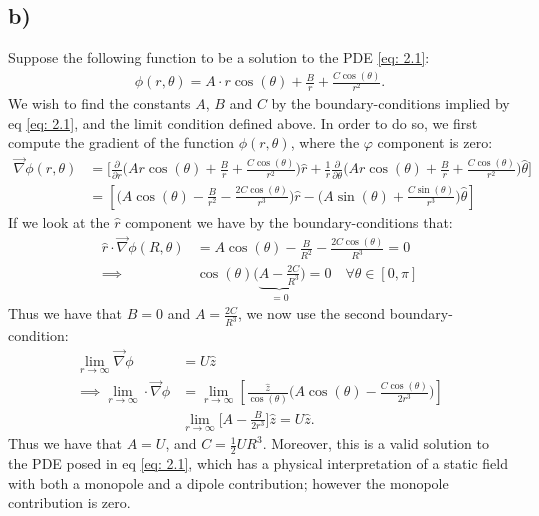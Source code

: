 \documentclass{article}
\begin{document}
\subsection*{b)}
Suppose the following function to be a solution to the PDE \eqref{eq: 2.1}:
\begin{align*}
    \phi(r, \theta) = A\cdot r\cos(\theta) + \frac{B}{r}+\frac{C\cos(\theta)}{r^2}.
\end{align*}
We wish to find the constants $A$, $B$ and $C$ by the boundary-conditions implied by eq \eqref{eq: 2.1}, and the limit condition defined above. In order to do so, we first compute the 
gradient of the function $\phi(r, \theta)$, where the $\varphi$ component is zero:
\begin{align*}
    \vec{\nabla}\phi(r, \theta)&=\Bigg[\frac{\partial}{\partial r}\Big(Ar\cos(\theta) + \frac{B}{r}+\frac{C\cos(\theta)}{r^2}\Big)\hat{r}+\frac{1}{r}\frac{\partial}{\partial \theta}\Big(Ar\cos(\theta) + \frac{B}{r}+\frac{C\cos(\theta)}{r^2}\Big)\hat{\theta}\Bigg]\\
    &=\left[\Big(A\cos(\theta) - \frac{B}{r^2} - \frac{2C\cos(\theta)}{r^3}\Big)\hat{r}-\Big(A\sin(\theta) +\frac{C\sin(\theta)}{r^3}\Big)\hat{\theta}\right]
\end{align*}
If we look at the $\hat{r}$ component we have by the boundary-conditions that:
\begin{align*}
    \hat{r}\cdot\vec{\nabla}\phi(R, \theta) &=A\cos(\theta) - \frac{B}{R^2} - \frac{2C\cos(\theta)}{R^3} = 0\\
    \implies &\cos(\theta)\Big(\underbrace{A-\frac{2C}{R^3}}_{=0}\Big)= 0\quad \forall\theta\in[0,\pi]
\end{align*}Thus we have that $B = 0$ and $A = \frac{2C}{R^3}$, we now use the second boundary-condition:
\begin{align*}
    \lim_{r\to\infty} \vec{\nabla}\phi &= U\hat{z}\\
    \implies \lim_{r\to\infty} \cdot\vec{\nabla}\phi&=\lim_{r\to\infty}\left[\frac{\hat{z}}{\cos(\theta)}\Big(A\cos(\theta) - \frac{C\cos(\theta)}{2r^3}\Big)\right]\\
    &\lim_{r\to\infty}\Big[A-\frac{B}{2r^3}\Big]\hat{z} = U\hat{z}.
\end{align*}Thus we have that $A = U$, and $C = \frac{1}{2}UR^3$. Moreover, this is a valid solution to the PDE posed in eq \eqref{eq: 2.1}, which has a physical interpretation of a static field with both a monopole and a dipole contribution; however the monopole contribution is zero.
\end{document}
